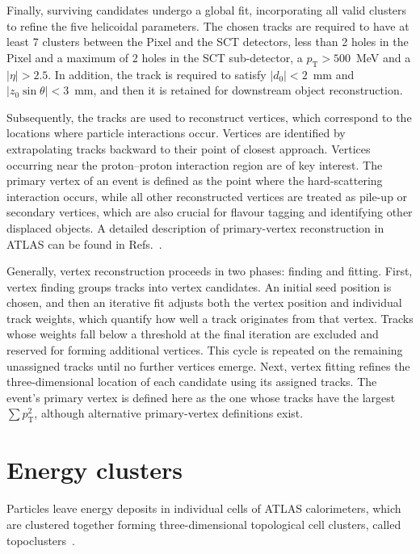Finally, surviving candidates undergo a global fit, incorporating all valid clusters to refine the five helicoidal parameters. The chosen tracks are required to have at least 7 clusters between the Pixel and the SCT detectors, less than 2 holes in the Pixel and a maximum of 2 holes in the SCT sub-detector, a $p_{\text{T}} > 500$~MeV and a $|\eta|>2.5$. In addition, the track is required to satisfy $|d_0|<2$~mm and $|z_0\sin\theta|<3$~mm, and then it is retained for downstream object reconstruction.

Subsequently, the tracks are used to reconstruct vertices, which correspond to the locations where particle interactions occur. Vertices are identified by extrapolating tracks backward to their point of closest approach. Vertices occurring near the proton–proton interaction region are of key interest. The primary vertex of an event is defined as the point where the hard-scattering interaction occurs, while all other reconstructed vertices are treated as pile-up or secondary vertices, which are also crucial for 
flavour tagging and identifying other displaced objects. A detailed description of primary-vertex reconstruction in ATLAS can be found in Refs.~\cite{vertex_run1,vertex_run2,vertex_run3}.

Generally, vertex reconstruction proceeds in two phases: finding and fitting. First, vertex finding groups tracks into vertex candidates. An initial seed position is chosen, and then an iterative fit adjusts both the vertex position and individual track weights, which quantify how well a track originates from that vertex. Tracks whose weights fall below a threshold at the final iteration are excluded and reserved for forming additional vertices. This cycle is repeated on the remaining unassigned tracks until no further vertices emerge. 
Next, vertex fitting refines the three-dimensional location of each candidate using its assigned tracks. The event’s primary vertex is defined here as the one whose tracks have the largest $\sum p^2_{\text{T}}$, although alternative primary-vertex definitions exist.

\section{Energy clusters}
\label{sec:clusters}

Particles leave energy deposits in individual cells of ATLAS calorimeters, which are clustered together forming three-dimensional topological cell clusters, called topoclusters~\cite{topo}.

